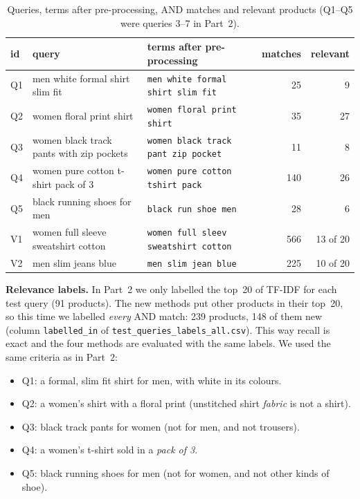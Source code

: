 \documentclass[11pt,a4paper]{article}
\begin{document}
\begin{table}[H]
\centering\small
\caption{Queries, terms after pre-processing, AND matches and relevant products (Q1--Q5 were queries 3--7 in Part~2).}
\label{tab:queries}
\begin{tabularx}{\textwidth}{@{}l>{\raggedright}p{4.6cm}Yrr@{}}
\toprule
id & query & terms after pre-processing & matches & relevant\\
\midrule
Q1 & men white formal shirt slim fit & \texttt{men white formal shirt slim fit} & 25 & 9\\
Q2 & women floral print shirt & \texttt{women floral print shirt} & 35 & 27\\
Q3 & women black track pants with zip pockets & \texttt{women black track pant zip pocket} & 11 & 8\\
Q4 & women pure cotton t-shirt pack of 3 & \texttt{women pure cotton tshirt pack} & 140 & 26\\
Q5 & black running shoes for men & \texttt{black run shoe men} & 28 & 6\\
\midrule
V1 & women full sleeve sweatshirt cotton & \texttt{women full sleev sweatshirt cotton} & 566 & 13 of 20\\
V2 & men slim jeans blue & \texttt{men slim jean blue} & 225 & 10 of 20\\
\bottomrule
\end{tabularx}
\end{table}

\textbf{Relevance labels.} In Part~2 we only labelled the top~20 of TF-IDF for each test query (91 products). The new
methods put other products in their top~20, so this time we labelled \emph{every} AND match: 239 products, 148 of them
new (column \texttt{labelled\_in} of \texttt{test\_queries\_labels\_all.csv}). This way recall is exact and the four
methods are evaluated with the same labels. We used the same criteria as in Part~2:
\begin{itemize}
\item Q1: a formal, slim fit shirt for men, with white in its colours.
\item Q2: a women's shirt with a floral print (unstitched shirt \emph{fabric} is not a shirt).
\item Q3: black track pants for women (not for men, and not trousers).
\item Q4: a women's t-shirt sold in a \emph{pack of 3}.
\item Q5: black running shoes for men (not for women, and not other kinds of shoe).
\end{itemize}
\end{document}
